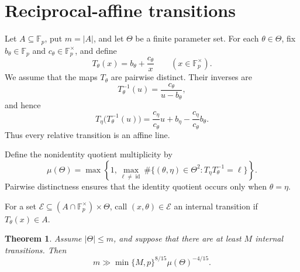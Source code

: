 \documentclass[11pt,reqno]{amsart}
\numberwithin{equation}{section}
\newtheorem{theorem}{Theorem}[section]
\theoremstyle{definition}
\theoremstyle{remark}
\newcommand{\F}{\mathbb F}
\newcommand{\id}{\operatorname{id}}
\newcommand{\cE}{\mathcal E}
\begin{document}
\section{Reciprocal-affine transitions}\label{sec:affine}

Let $A\subseteq\F_p$, put $m=|A|$, and let $\Theta$ be a finite parameter set.  For each $\theta\in\Theta$, fix $b_\theta\in\F_p$ and $c_\theta\in\F_p^\times$, and define
\begin{equation}\label{eq:affine-T}
  T_\theta(x)=b_\theta+\frac{c_\theta}{x}
  \qquad (x\in\F_p^\times).
\end{equation}
We assume that the maps $T_\theta$ are pairwise distinct.  Their inverses are
\[
  T_\theta^{-1}(u)=\frac{c_\theta}{u-b_\theta},
\]
and hence
\begin{equation}\label{eq:affine-quotient}
  T_\eta\bigl(T_\theta^{-1}(u)\bigr)
  =\frac{c_\eta}{c_\theta}u
   +b_\eta-\frac{c_\eta}{c_\theta}b_\theta.
\end{equation}
Thus every relative transition is an affine line.

Define the nonidentity quotient multiplicity by
\begin{equation}\label{eq:affine-multiplicity}
  \mu(\Theta)
  =\max\left\{1,
  \max_{\ell\ne\id}
  \#\{(\theta,\eta)\in\Theta^2:
  T_\eta T_\theta^{-1}=\ell\}\right\}.
\end{equation}
Pairwise distinctness ensures that the identity quotient occurs only when $\theta=\eta$.

For a set $\cE\subseteq(A\cap\F_p^\times)\times\Theta$, call $(x,\theta)\in\cE$ an internal transition if $T_\theta(x)\in A$.

\begin{theorem}\label{thm:affine}
Assume $|\Theta|\le m$, and suppose that there are at least $M$ internal transitions.  Then
\begin{equation}\label{eq:affine-main}
  m\gg \min\{M,p\}^{8/15}\mu(\Theta)^{-4/15}.
\end{equation}
\end{theorem}
\end{document}
